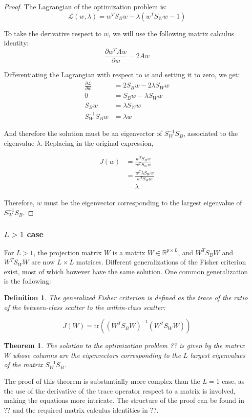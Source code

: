 \documentclass[a4paper,12pt]{article}
\newtheorem{theorem}{Theorem}
\newtheorem{definition}{Definition}
\begin{document}
\begin{proof}
The Lagrangian of the optimization problem is:
\[
\mathcal{L}(w, \lambda) = w^T S_B w - \lambda(w^T S_W w - 1)
\]

To take the derivative respect to $w$, we will use the following matrix calculus identity:
\[
\frac{\partial w^T A w}{\partial w} = 2Aw
\]

Differentiating the Lagrangian with respect to $w$ and setting it to zero, we get:
\begin{align*}
\frac{\partial \mathcal{L}}{\partial w} &= 2S_B w - 2\lambda S_W w \\
0 &= S_B w - \lambda S_W w \\
S_B w &= \lambda S_W w \\
S_W^{-1} S_B w &= \lambda w
\end{align*}

And therefore the solution must be an eigenvector of $S_W^{-1} S_B$, associated to the eigenvalue $\lambda$. Replacing in the original expression,

\begin{align*}
J(w) &= \frac{w^T S_B w}{w^T S_W w} \\
&= \frac{w^T \lambda S_W w}{w^T S_W w} \\
& = \lambda
\end{align*}

Therefore, $w$ must be the eigenvector corresponding to the largest eigenvalue of $S_W^{-1} S_B$.

\end{proof}

\subsubsection{$L>1$ case}
For $L>1$, the projection matrix $W$ is a matrix $W \in \mathbb{R}^{p \times L}$, and $W^T S_B W$ and $W^T S_W W$ are now $L \times L$ matrices. Different generalizations of the Fisher criterion exist, most of which however have the same solution. One common generalization is the following:

\begin{definition}
The generalized Fisher criterion is defined as the trace of the ratio of the between-class scatter to the within-class scatter:

\[
J(W) = \text{tr}((W^T S_B W)^{-1} (W^T S_W W))
\]
\end{definition}

\begin{theorem}
The solution to the optimization problem ?? is given by the matrix $W$ whose columns are the eigenvectors corresponding to the $L$ largest eigenvalues of the matrix $S_W^{-1} S_B$.
\end{theorem}

The proof of this theorem is substantially more complex than the $L=1$ case, as the use of the derivative of the trace operator respect to a matrix is involved, making the equations more intricate. The structure of the proof can be found in ?? and the required matrix calculus identities in ??.
\end{document}

